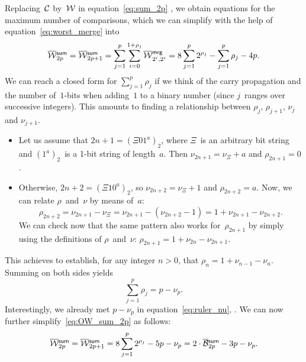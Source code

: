Replacing~\(\mathcal{C}\) by~\(\mathcal{W}\) in equation~\eqref{eq:sum_2p}
, we obtain equations for the maximum number of
comparisons, which we can simplify with the help of
equation~\eqref{eq:worst_merge}  into
\begin{equation}
\OW{\fun{sum}}{2p}
  = \OW{\fun{sum}}{2p+1}
  = \sum_{j=1}^{p}\sum_{i=0}^{1+\rho_{j}}{\OW{\fun{mrg}}{2^i,2^i}}
  = 8\sum_{j=1}^{p}{2^{\rho_j}} - \sum_{j=1}^{p}\rho_j - 4p.
\label{eq:OW_sum_2p}
\index{sum@$\OW{\fun{sum}}{n}$}
\end{equation}
  We can reach a closed form
for \(\sum_{j=1}^{p}\rho_j\) if we think of the carry propagation and
the number of~\(1\)-bits when adding~\(1\) to a binary number (since
\(j\)~ranges over successive integers). This amounts to finding a
relationship between \(\rho_j\), \(\rho_{j+1}\), \(\nu_j\) and
\(\nu_{j+1}\).
\begin{itemize}

  \item Let us assume that \(2n+1 = (\Xi 01^a)_2\), where \(\Xi\)~is
    an arbitrary bit string and \((1^a)_2\)~is a 1-bit string of
    length~\(a\). Then \(\nu_{2n+1} = \nu_{\Xi} + a\) and
    \(\rho_{2n+1} = 0\).

  \item Otherwise, \(2n+2 = (\Xi 10^a)_2\), so \(\nu_{2n+2} =
    \nu_{\Xi} + 1\) and \(\rho_{2n+2} = a\). Now, we can relate
    \(\rho\)~and~\(\nu\) by means of~\(a\):
    \begin{equation*}
      \rho_{2n+2} = \nu_{2n+1} - \nu_{\Xi} = \nu_{2n+1} - (\nu_{2n+2} - 1)
      = 1 + \nu_{2n+1} - \nu_{2n+2}.
    \end{equation*}
    We can check now that the same pattern also works
    for~\(\rho_{2n+1}\) by simply using the definitions of
    \(\rho\)~and~\(\nu\): \(\rho_{2n+1} = 1 + \nu_{2n} - \nu_{2n+1}\).
\end{itemize}
This achieves to establish, for any integer \(n>0\), that \(\rho_n = 1
+ \nu_{n-1} - \nu_{n}\). Summing on both sides yields
\begin{equation*}
\sum_{j=1}^{p}{\rho_j} = p - \nu_p.
\end{equation*}
Interestingly, we already met \(p - \nu_p\)  in equation~\eqref{eq:ruler_nu},
. We can now further
simplify~\eqref{eq:OW_sum_2p} as follows:
\begin{equation*}
\OW{\fun{sum}}{2p}
 = \OW{\fun{sum}}{2p+1}
 = 8\sum_{j=1}^{p}{2^{\rho_j}} - 5p - \nu_p
 = 2 \cdot \OB{\fun{sum}}{2p} - 3p - \nu_p.
\index{sum@$\OW{\fun{sum}}{n}$}
\end{equation*}
